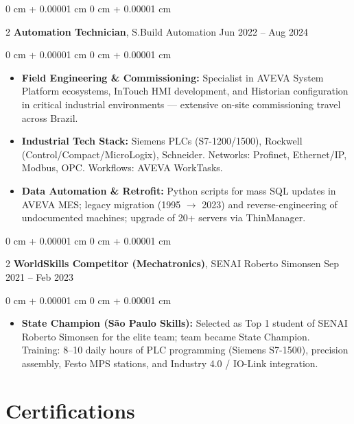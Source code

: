 \documentclass[10pt, letterpaper]{article}
\newenvironment{highlights}{ \begin{itemize}[ topsep=0.10 cm, parsep=0.10 cm, partopsep=0pt,
itemsep=0pt, leftmargin=0 cm + 10pt ] }{ \end{itemize} }
\newenvironment{onecolentry}{ \begin{adjustwidth}{ 0 cm + 0.00001 cm }{ 0 cm + 0.00001 cm }
}{ \end{adjustwidth} }
\newenvironment{twocolentry}[2][]{ \onecolentry \def\secondColumn{#2} \setcolumnwidth{\fill, 4.5 cm}
\begin{paracol}{2} }{ \switchcolumn \raggedleft \secondColumn \end{paracol}
\endonecolentry }
\begin{document}
	\vspace{0.2 cm}

	\begin{twocolentry}
		{ Jun 2022 -- Aug 2024 } \textbf{Automation Technician}, S.Build Automation
	\end{twocolentry}

	\vspace{0.10 cm}
	\begin{onecolentry}
		\begin{highlights}
			\item \textbf{Field Engineering \& Commissioning:} Specialist in AVEVA System Platform ecosystems, InTouch HMI development, and Historian configuration in critical industrial environments --- extensive on-site commissioning travel across Brazil.
            \item \textbf{Industrial Tech Stack:} Siemens PLCs (S7-1200/1500), Rockwell (Control/Compact/MicroLogix), Schneider. Networks: Profinet, Ethernet/IP, Modbus, OPC. Workflows: AVEVA WorkTasks.
            \item \textbf{Data Automation \& Retrofit:} Python scripts for mass SQL updates in AVEVA MES; legacy migration (1995 $\rightarrow$ 2023) and reverse-engineering of undocumented machines; upgrade of 20+ servers via ThinManager.
		\end{highlights}
	\end{onecolentry}

    \vspace{0.2 cm}

    \begin{twocolentry}
		{ Sep 2021 -- Feb 2023 } \textbf{WorldSkills Competitor (Mechatronics)}, SENAI Roberto Simonsen
	\end{twocolentry}

	\vspace{0.10 cm}
	\begin{onecolentry}
		\begin{highlights}
			\item \textbf{State Champion (São Paulo Skills):} Selected as Top 1 student of SENAI Roberto Simonsen for the elite team; team became State Champion. Training: 8--10 daily hours of PLC programming (Siemens S7-1500), precision assembly, Festo MPS stations, and Industry 4.0 / IO-Link integration.
		\end{highlights}
	\end{onecolentry}

    \section{Certifications}
\end{document}
